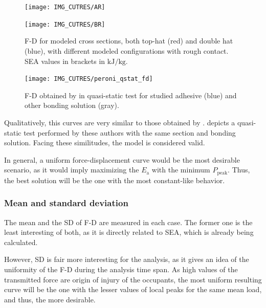 \documentclass[cmfonts]{witpress}
\begin{document}
\begin{figure}
	\centering
	\begin{minipage}[b]{.9\linewidth}
		\centering
		\texttt{[image: IMG\_CUTRES/AR]}
	\end{minipage}
	\quad
	\begin{minipage}[b]{.9\linewidth}
		\centering
		\texttt{[image: IMG\_CUTRES/BR]}
	\end{minipage}
	\caption[F-D for modeled cross sections, both top-hat and double hat, with different modeled configurations with rough contact.]{F-D for modeled cross sections, both top-hat (red) and double hat (blue), with different modeled configurations with rough contact. SEA values in brackets in $\si{\kJ/\kg}$.}
	\label{fig:F-D_rough}
\end{figure}

\begin{figure}
	\centering
	\texttt{[image: IMG\_CUTRES/peroni\_qstat\_fd]}
	\caption[F-D obtained by \cite{Peroni2009} in quasi-static test for studied adhesive and other bonding solution.]{F-D obtained by \cite{Peroni2009} in quasi-static test for studied adhesive (blue) and other bonding solution (gray).}
	\label{fig:peroni_qstat_fd}
\end{figure}

Qualitatively, this curves are very similar to those obtained by \cite{Peroni2009}.  depicts a quasi-static test performed by these authors with the same section and bonding solution. Facing these similitudes, the model is considered valid.

In general, a uniform force-displacement curve would be the most desirable scenario, as it would imply maximizing the $E_\text{a}$  with the minimum $P_\text{peak}$. Thus, the best solution will be the one with the most constant-like behavior.

\subsubsection{Mean and standard deviation}

The mean and the SD of F-D are measured in each case. The former one is the least interesting of both, as it is directly related to SEA, which is already being calculated.

However, SD is fair more interesting for the analysis, as it gives an idea of the uniformity of the F-D during the analysis time span. As high values of the transmitted force are origin of injury of the occupants, the most uniform resulting curve will be the one with the lesser values of local peaks for the same mean load, and thus, the more desirable.
\end{document}

